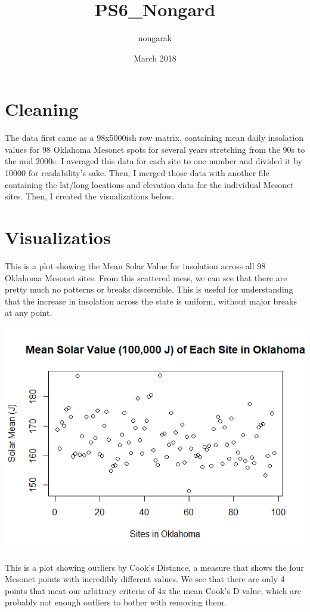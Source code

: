 \documentclass{article}
\title{PS6_Nongard}
\author{nongarak }
\date{March 2018}
\begin{document}
\maketitle

\section{Cleaning}
The data first came as a 98x5000ish row matrix, containing mean daily insolation values for 98 Oklahoma Mesonet spots for several years stretching from the 90s to the mid 2000s. I averaged this data for each site to one number and divided it by 10000 for readability's sake. 
Then, I merged those data with another file containing the lat/long locations and elevation data for the individual Mesonet sites. Then, I created the visualizations below. 


\section{Visualizatios}
This is a plot showing the Mean Solar Value for insolation across all 98 Oklahoma Mesonet sites. From this scattered mess, we can see that there are pretty much no patterns or breaks discernible. This is useful for understanding that the increase in insolation across the state is uniform, without major breaks at any point. 

\includegraphics{msv}

This is a plot showing outliers by Cook's Distance, a measure that shows the four Mesonet points with incredibly different values. We see that there are only 4 points that meat our arbitrary criteria of 4x the mean Cook's D value, which are probably not enough outliers to bother with removing them.
\end{document}
